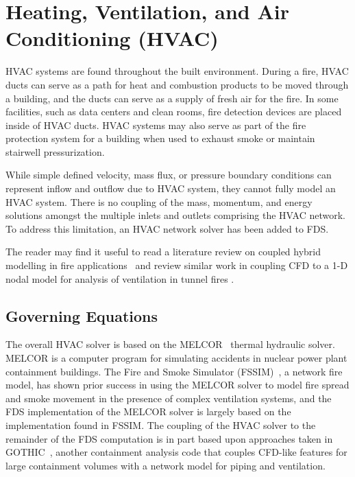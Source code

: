 

\chapter{Heating, Ventilation, and Air Conditioning (HVAC)}

HVAC systems are found throughout the built environment.  During a fire, HVAC ducts can serve as a path for heat and combustion products to be moved through a building, and the ducts can serve as a supply of fresh air for the fire.  In some facilities, such as data centers and clean rooms, fire detection devices are placed inside of HVAC ducts. HVAC systems may also serve as part of the fire protection system for a building when used to exhaust smoke or maintain stairwell pressurization.

While simple defined velocity, mass flux, or pressure boundary conditions can represent inflow and outflow due to HVAC system, they cannot fully model an HVAC system. There is no coupling of the mass, momentum, and energy solutions amongst the multiple inlets and outlets comprising the HVAC network. To address this limitation, an HVAC network solver has been added to FDS.

The reader may find it useful to read a literature review on coupled hybrid modelling in fire applications~\cite{Ralph:1} and review similar work in coupling CFD to a 1-D nodal model for analysis of ventilation in tunnel fires \cite{Colella:2010, Colella:2011}.

\section{Governing Equations}

The overall HVAC solver is based on the MELCOR~\cite{MELCOR} thermal hydraulic solver.  MELCOR is a computer program for simulating accidents in nuclear power plant containment buildings.
The Fire and Smoke Simulator (FSSIM)~\cite{FSSIM}, a network fire model, has shown prior success in using the MELCOR solver to model fire spread and smoke movement
in the presence of complex ventilation systems, and the FDS implementation of the MELCOR solver is largely based on the implementation found in FSSIM.  The coupling of the HVAC solver to the remainder of the FDS computation is in part based upon approaches taken in GOTHIC~\cite{GOTHIC}, another containment analysis code that couples CFD-like features for large containment volumes with a network model for piping and ventilation.

